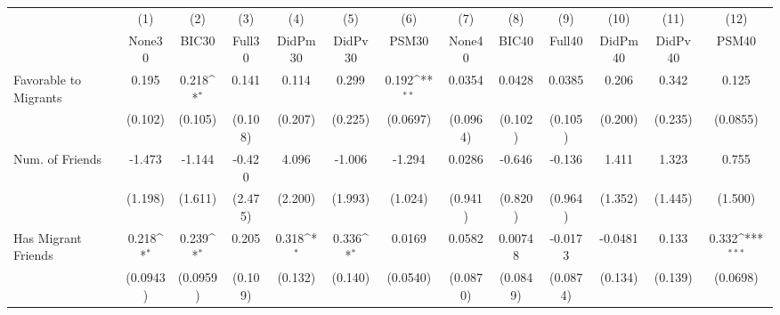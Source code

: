 {
\def\sym#1{\ifmmode^{#1}\else\(^{#1}\)\fi}
\begin{tabular}{l*{12}{c}}
\toprule
            &\multicolumn{1}{c}{(1)}&\multicolumn{1}{c}{(2)}&\multicolumn{1}{c}{(3)}&\multicolumn{1}{c}{(4)}&\multicolumn{1}{c}{(5)}&\multicolumn{1}{c}{(6)}&\multicolumn{1}{c}{(7)}&\multicolumn{1}{c}{(8)}&\multicolumn{1}{c}{(9)}&\multicolumn{1}{c}{(10)}&\multicolumn{1}{c}{(11)}&\multicolumn{1}{c}{(12)}\\
            &\multicolumn{1}{c}{None30}&\multicolumn{1}{c}{BIC30}&\multicolumn{1}{c}{Full30}&\multicolumn{1}{c}{DidPm30}&\multicolumn{1}{c}{DidPv30}&\multicolumn{1}{c}{PSM30}&\multicolumn{1}{c}{None40}&\multicolumn{1}{c}{BIC40}&\multicolumn{1}{c}{Full40}&\multicolumn{1}{c}{DidPm40}&\multicolumn{1}{c}{DidPv40}&\multicolumn{1}{c}{PSM40}\\
\midrule
Favorable to Migrants&       0.195         &       0.218\sym{*}  &       0.141         &       0.114         &       0.299         &       0.192\sym{**} &      0.0354         &      0.0428         &      0.0385         &       0.206         &       0.342         &       0.125         \\
            &     (0.102)         &     (0.105)         &     (0.108)         &     (0.207)         &     (0.225)         &    (0.0697)         &    (0.0964)         &     (0.102)         &     (0.105)         &     (0.200)         &     (0.235)         &    (0.0855)         \\
\addlinespace
Num. of Friends&      -1.473         &      -1.144         &      -0.420         &       4.096         &      -1.006         &      -1.294         &      0.0286         &      -0.646         &      -0.136         &       1.411         &       1.323         &       0.755         \\
            &     (1.198)         &     (1.611)         &     (2.475)         &     (2.200)         &     (1.993)         &     (1.024)         &     (0.941)         &     (0.820)         &     (0.964)         &     (1.352)         &     (1.445)         &     (1.500)         \\
\addlinespace
Has Migrant Friends&       0.218\sym{*}  &       0.239\sym{*}  &       0.205         &       0.318\sym{*}  &       0.336\sym{*}  &      0.0169         &      0.0582         &     0.00748         &     -0.0173         &     -0.0481         &       0.133         &       0.332\sym{***}\\
            &    (0.0943)         &    (0.0959)         &     (0.109)         &     (0.132)         &     (0.140)         &    (0.0540)         &    (0.0870)         &    (0.0849)         &    (0.0874)         &     (0.134)         &     (0.139)         &    (0.0698)         \\

\end{tabular}}

